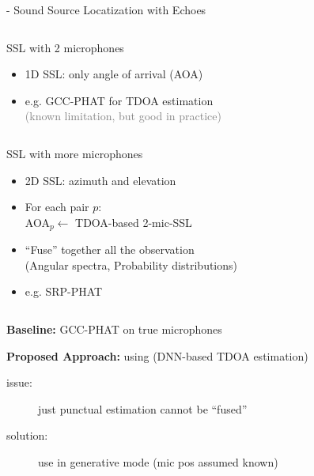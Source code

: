 \begin{frame}{\mirage - Sound Source Locatization with Echoes}

    \begin{columns}[T,onlytextwidth]
        \begin{block}{SSL with 2 microphones}
            \begin{itemize}
                \item 1D SSL: only angle of arrival (AOA)
                \item e.g. GCC-PHAT for TDOA estimation~\cite{knapp1976generalized}
                \\\textcolor{gray}{\small (known limitation, but good in practice)}
            \end{itemize}
        \end{block}
    \end{columns}
    \pause

    \begin{columns}[T,onlytextwidth]
        \begin{block}{SSL with more microphones}
            \begin{itemize}
                \item 2D SSL: azimuth and elevation
                \item[1.] For each pair $p$:
                \\\hspace{1em} AOA$_p \gets$ TDOA-based 2-mic-SSL
                \item[2.] ``Fuse''  together all the observation
                \\(Angular spectra, Probability distributions)
                \item e.g. SRP-PHAT~\cite{dibiase2001robust}
            \end{itemize}
        \end{block}
    \end{columns}

    \pause
    \textbf{Baseline:} GCC-PHAT on true microphones

    \pause
    \textbf{Proposed Approach:} using \lantern (DNN-based TDOA estimation)

    \pause
    \begin{description}
        \item[issue:] just punctual estimation cannot be ``fused''
        \item[solution:] use \lantern in generative mode (mic pos assumed known)
    \end{description}
\end{frame}

